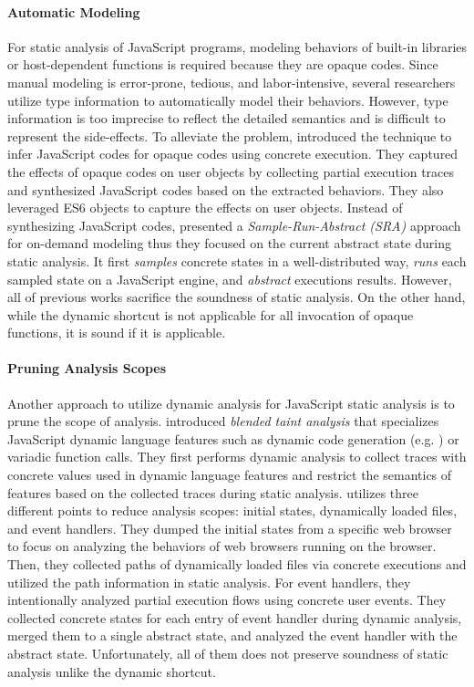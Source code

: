 \paragraph{Automatic Modeling}
For static analysis of JavaScript programs, modeling behaviors of built-in
libraries or host-dependent functions is required because they are opaque
codes.  Since manual modeling is error-prone, tedious, and labor-intensive,
several researchers~\cite{safewapi, safets} utilize type information to
automatically model their behaviors.  However, type information is too imprecise
to reflect the detailed semantics and is difficult to represent the
side-effects.  To alleviate the problem, \citet{mimic} introduced the technique
to infer JavaScript codes for opaque codes using concrete execution.  They
captured the effects of opaque codes on user objects by collecting partial
execution traces and synthesized JavaScript codes based on the extracted
behaviors.  They also leveraged ES6  objects to capture the
effects on user objects.  Instead of synthesizing JavaScript codes,
\citet{opaque-model} presented a \textit{Sample-Run-Abstract (SRA)} approach for
on-demand modeling thus they focused on the current abstract state during static
analysis.  It first \textit{samples} concrete states in a well-distributed way,
\textit{runs} each sampled state on a JavaScript engine, and \textit{abstract}
executions results.  However, all of previous works sacrifice the soundness of
static analysis.  On the other hand, while the dynamic shortcut is not
applicable for all invocation of opaque functions, it is sound if it is
applicable.


\paragraph{Pruning Analysis Scopes}
Another approach to utilize dynamic analysis for JavaScript static analysis is
to prune the scope of analysis.  \citet{blended} introduced \textit{blended
taint analysis} that specializes JavaScript dynamic language features such as
dynamic code generation (e.g. ) or variadic function calls.  They
first performs dynamic analysis to collect traces with concrete values used in
dynamic language features and restrict the semantics of features based on the
collected traces during static analysis.  \citet{battles, eha} utilizes three
different points to reduce analysis scopes: initial states, dynamically loaded
files, and event handlers.  They dumped the initial states from a specific web
browser to focus on analyzing the behaviors of web browsers running on the
browser.  Then, they collected paths of dynamically loaded files via concrete
executions and utilized the path information in static analysis.  For event
handlers, they intentionally analyzed partial execution flows using concrete
user events.  They collected concrete states for each entry of event handler
during dynamic analysis, merged them to a single abstract state, and analyzed
the event handler with the abstract state.  Unfortunately, all of them does not
preserve soundness of static analysis unlike the dynamic shortcut.


